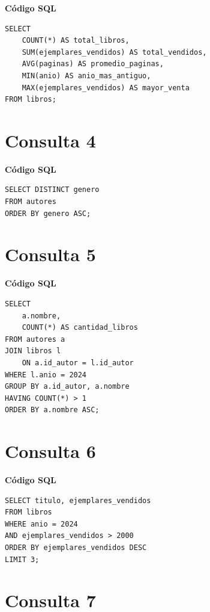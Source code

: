 \textbf{Código SQL}

\begin{lstlisting}
SELECT
    COUNT(*) AS total_libros,
    SUM(ejemplares_vendidos) AS total_vendidos,
    AVG(paginas) AS promedio_paginas,
    MIN(anio) AS anio_mas_antiguo,
    MAX(ejemplares_vendidos) AS mayor_venta
FROM libros;
\end{lstlisting}



\clearpage
\section*{Consulta 4}

\textbf{Código SQL}

\begin{lstlisting}
SELECT DISTINCT genero
FROM autores
ORDER BY genero ASC;
\end{lstlisting}



\clearpage
\section*{Consulta 5}

\textbf{Código SQL}

\begin{lstlisting}
SELECT
    a.nombre,
    COUNT(*) AS cantidad_libros
FROM autores a
JOIN libros l
    ON a.id_autor = l.id_autor
WHERE l.anio = 2024
GROUP BY a.id_autor, a.nombre
HAVING COUNT(*) > 1
ORDER BY a.nombre ASC;
\end{lstlisting}



\clearpage
\section*{Consulta 6}

\textbf{Código SQL}

\begin{lstlisting}
SELECT titulo, ejemplares_vendidos
FROM libros
WHERE anio = 2024
AND ejemplares_vendidos > 2000
ORDER BY ejemplares_vendidos DESC
LIMIT 3;
\end{lstlisting}



\clearpage
\section*{Consulta 7}


